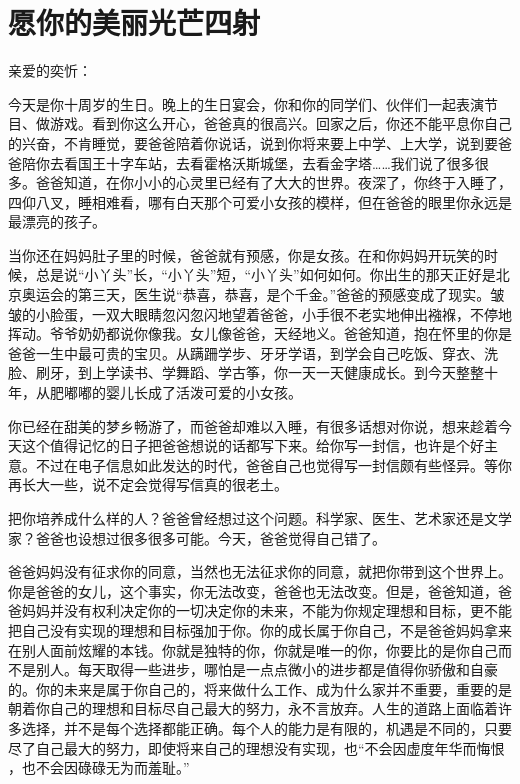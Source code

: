 \section{愿你的美丽光芒四射}

\noindent 亲爱的奕忻：

\mbox{}

今天是你十周岁的生日。晚上的生日宴会，你和你的同学们、伙伴们一起表演节目、做游戏。看到你这么开心，爸爸真的很高兴。回家之后，你还不能平息你自己的兴奋，不肯睡觉，要爸爸陪着你说话，说到你将来要上中学、上大学，说到要爸爸陪你去看国王十字车站，去看霍格沃斯城堡，去看金字塔……我们说了很多很多。爸爸知道，在你小小的心灵里已经有了大大的世界。夜深了，你终于入睡了，四仰八叉，睡相难看，哪有白天那个可爱小女孩的模样，但在爸爸的眼里你永远是最漂亮的孩子。

当你还在妈妈肚子里的时候，爸爸就有预感，你是女孩。在和你妈妈开玩笑的时候，总是说“小丫头”长，“小丫头”短，“小丫头”如何如何。你出生的那天正好是北京奥运会的第三天，医生说“恭喜，恭喜，是个千金。”爸爸的预感变成了现实。皱皱的小脸蛋，一双大眼睛忽闪忽闪地望着爸爸，小手很不老实地伸出襁褓，不停地挥动。爷爷奶奶都说你像我。女儿像爸爸，天经地义。爸爸知道，抱在怀里的你是爸爸一生中最可贵的宝贝。从蹒跚学步、牙牙学语，到学会自己吃饭、穿衣、洗脸、刷牙，到上学读书、学舞蹈、学古筝，你一天一天健康成长。到今天整整十年，从肥嘟嘟的婴儿长成了活泼可爱的小女孩。

你已经在甜美的梦乡畅游了，而爸爸却难以入睡，有很多话想对你说，想来趁着今天这个值得记忆的日子把爸爸想说的话都写下来。给你写一封信，也许是个好主意。不过在电子信息如此发达的时代，爸爸自己也觉得写一封信颇有些怪异。等你再长大一些，说不定会觉得写信真的很老土。

把你培养成什么样的人？爸爸曾经想过这个问题。科学家、医生、艺术家还是文学家？爸爸也设想过很多很多可能。今天，爸爸觉得自己错了。

爸爸妈妈没有征求你的同意，当然也无法征求你的同意，就把你带到这个世界上。你是爸爸的女儿，这个事实，你无法改变，爸爸也无法改变。但是，爸爸知道，爸爸妈妈并没有权利决定你的一切决定你的未来，不能为你规定理想和目标，更不能把自己没有实现的理想和目标强加于你。你的成长属于你自己，不是爸爸妈妈拿来在别人面前炫耀的本钱。你就是独特的你，你就是唯一的你，你要比的是你自己而不是别人。每天取得一些进步，哪怕是一点点微小的进步都是值得你骄傲和自豪的。你的未来是属于你自己的，将来做什么工作、成为什么家并不重要，重要的是朝着你自己的理想和目标尽自己最大的努力，永不言放弃。人生的道路上面临着许多选择，并不是每个选择都能正确。每个人的能力是有限的，机遇是不同的，只要尽了自己最大的努力，即使将来自己的理想没有实现，也“不会因虚度年华而悔恨 ，也不会因碌碌无为而羞耻。”

